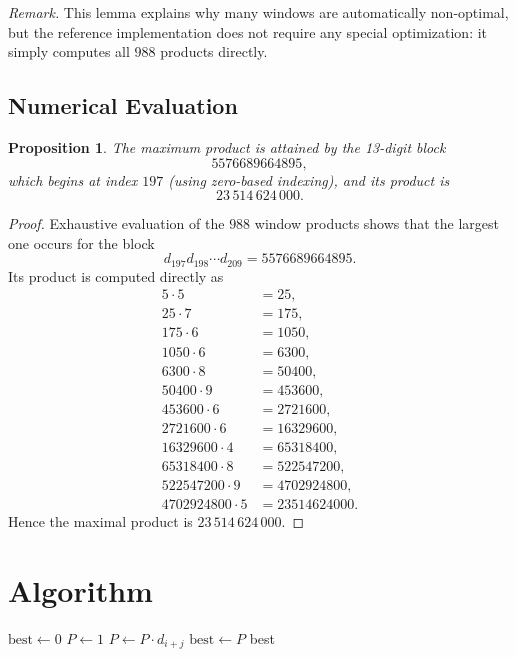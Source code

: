 \documentclass[11pt]{article}
\newtheorem{proposition}[theorem]{Proposition}
\begin{document}
\noindent\emph{Remark.} This lemma explains why many windows are automatically non-optimal, but the reference implementation does not require any special optimization: it simply computes all $988$ products directly.

\subsection{Numerical Evaluation}

\begin{proposition}
The maximum product is attained by the 13-digit block
\[
5576689664895,
\]
which begins at index $197$ (using zero-based indexing), and its product is
\[
23\,514\,624\,000.
\]
\end{proposition}

\begin{proof}
Exhaustive evaluation of the $988$ window products shows that the largest one occurs for the block
\[
d_{197} d_{198} \cdots d_{209} = 5576689664895.
\]
Its product is computed directly as
\[
\begin{aligned}
5 \cdot 5 &= 25,\\
25 \cdot 7 &= 175,\\
175 \cdot 6 &= 1050,\\
1050 \cdot 6 &= 6300,\\
6300 \cdot 8 &= 50400,\\
50400 \cdot 9 &= 453600,\\
453600 \cdot 6 &= 2721600,\\
2721600 \cdot 6 &= 16329600,\\
16329600 \cdot 4 &= 65318400,\\
65318400 \cdot 8 &= 522547200,\\
522547200 \cdot 9 &= 4702924800,\\
4702924800 \cdot 5 &= 23514624000.
\end{aligned}
\]
Hence the maximal product is $23\,514\,624\,000$.
\end{proof}

\section{Algorithm}

\begin{algorithm}[H]
\caption{Largest product of $k$ consecutive digits}
\begin{algorithmic}[1]
\STATE $\text{best} \gets 0$
    \STATE $P \gets 1$
        \STATE $P \gets P \cdot d_{i+j}$
    \ENDFOR
        \STATE $\text{best} \gets P$
    \ENDIF
\ENDFOR
\RETURN best
\end{algorithmic}
\end{algorithm}
\end{document}
